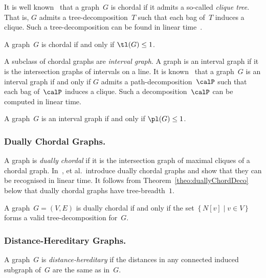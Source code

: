 It is well known~\cite{Gavril1974} that a graph~$G$ is chordal if it admits a so-called \emph{clique tree}.
That is, $G$ admits a tree-decomposition~$T$ such that each bag of~$T$ induces a clique.
Such a tree-decomposition can be found in linear time~\cite{Spinrad2003}.

\begin{theorem}
    \label{theo:chordalLength}
A graph~\( G \) is chordal if and only if \( \tl(G) \leq 1 \).
\end{theorem}

A subclass of chordal graphs are \emph{interval graph}.
A graph is an interval graph if it is the intersection graphs of intervals on a line.
It is known~\cite{GilmorHoffma1964} that a graph~$G$ is an interval graph if and only if $G$ admits a path-decomposition~$\calP$ such that each bag of~$\calP$ induces a clique.
Such a decomposition~$\calP$ can be computed in linear time.

\begin{theorem}
    \label{theo:intervalPL}
A graph~\( G \) is an interval graph if and only if \( \pl(G) \leq 1 \).
\end{theorem}


\subsubsection{Dually Chordal Graphs.}
A graph is \emph{dually chordal} if it is the intersection graph of maximal cliques of a chordal graph.
In~\cite{BraDraCheVol1998},  et al.\ introduce dually chordal graphs and show that they can be recognised in linear time.
It follows from Theorem~\ref{theo:duallyChordDeco} below that dually chordal graphs have tree-breadth~$1$.

\begin{theorem}
    \label{theo:duallyChordDeco}
A graph~\( G = (V, E) \) is dually chordal if and only if the set~\( \big \{ \, N[v] \mid v \in V \, \big \} \) forms a valid tree-decomposition for~\( G \).
\end{theorem}

\subsubsection{Distance-Hereditary Graphs.}
A graph~$G$ is \emph{distance-hereditary} if the distances in any connected induced subgraph of~$G$ are the same as in~$G$.

